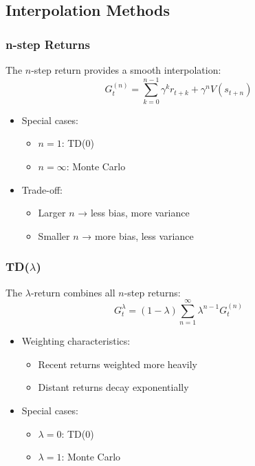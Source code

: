 \documentclass{article}
\begin{document}
\subsection{Interpolation Methods}

\subsubsection{n-step Returns}
The $n$-step return provides a smooth interpolation:
\begin{equation}
    G_t^{(n)} = \sum_{k=0}^{n-1} \gamma^k r_{t+k} + \gamma^n V(s_{t+n})
\end{equation}

\begin{itemize}
    \item Special cases:
        \begin{itemize}
            \item $n=1$: TD(0)
            \item $n=\infty$: Monte Carlo
        \end{itemize}
    \item Trade-off:
        \begin{itemize}
            \item Larger $n$ → less bias, more variance
            \item Smaller $n$ → more bias, less variance
        \end{itemize}
\end{itemize}

\subsubsection{TD($\lambda$)}
The $\lambda$-return combines all $n$-step returns:
\begin{equation}
    G_t^\lambda = (1 - \lambda) \sum_{n=1}^\infty \lambda^{n-1} G_t^{(n)}
\end{equation}

\begin{itemize}
    \item Weighting characteristics:
        \begin{itemize}
            \item Recent returns weighted more heavily
            \item Distant returns decay exponentially
        \end{itemize}
    \item Special cases:
        \begin{itemize}
            \item $\lambda=0$: TD(0)
            \item $\lambda=1$: Monte Carlo
        \end{itemize}
\end{itemize}
\end{document}
